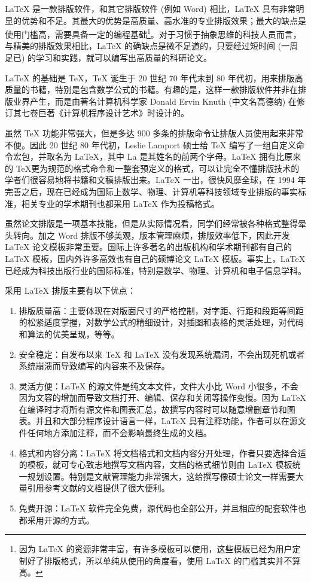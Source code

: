\LaTeX{} 是一款排版软件，和其它排版软件 (例如 Word) 相比，\LaTeX{} 具有非常明显的优势和不足。其最大的优势是高质量、高水准的专业排版效果；最大的缺点是使用门槛高，需要具备一定的编程基础\footnote{因为 \LaTeX{} 的资源非常丰富，有许多模板可以使用，这些模板已经为用户定制好了排版格式，所以单纯从使用的角度看，使用 \LaTeX{} 的门槛其实并不算高。}。对于习惯于抽象思维的科技人员而言，与精美的排版效果相比，\LaTeX{} 的确缺点是微不足道的，只要经过短时间 (一周足已) 的学习和实践，就可以编写出高质量的科研论文。

\LaTeX{} 的基础是 \TeX，\TeX{} 诞生于 20 世纪 70 年代末到 80 年代初，用来排版高质量的书籍，特别是包含数学公式的书籍。有趣的是，这样一款排版软件并非在排版业界产生，而是由著名计算机科学家 Donald Ervin Knuth (中文名高德纳) 在修订其七卷巨著《计算机程序设计艺术》时设计的。

虽然 \TeX{} 功能非常强大，但是多达 900 多条的排版命令让排版人员使用起来非常不便。因此 20 世纪 80 年代初，Leslie Lamport 硕士给 \TeX{} 编写了一组自定义命令宏包，并取名为 \LaTeX，其中 La 是其姓名的前两个字母。\LaTeX{} 拥有比原来的 \TeX 更为规范的格式命令和一整套预定义的格式，可以让完全不懂排版技术的学者们很容易地将书籍和文稿排版出来。\LaTeX{} 一出，很快风靡全球，在 1994 年 \LaTeXe{} 完善之后，现在已经成为国际上数学、物理、计算机等科技领域专业排版的事实标准，相关专业的学术期刊也都采用 \LaTeX{} 作为投稿格式。


虽然论文排版是一项基本技能，但是从实际情况看，同学们经常被各种格式整得晕头转向。加之 Word 排版不够美观，版本管理麻烦，排版效率低下，因此开发 \LaTeX{} 论文模板非常重要。国际上许多著名的出版机构和学术期刊都有自己的 \LaTeX{} 模板，国内外许多高效也有自己的硕博论文 \LaTeX{} 模板。事实上，\LaTeX{} 已经成为科技出版行业的国际标准，特别是数学、物理、计算机和电子信息学科。

采用 \LaTeX{} 排版主要有以下优点：
\begin{enumerate}
	\item 排版质量高：主要体现在对版面尺寸的严格控制，对字距、行距和段距等间距的松紧适度掌握，对数学公式的精细设计，对插图和表格的灵活处理，对代码和算法的优美呈现，等等。
	\item 安全稳定：自发布以来 \TeX{} 和 \LaTeX{} 没有发现系统漏洞，不会出现死机或者系统崩溃而导致编写的内容来不及保存。
	\item 灵活方便：\LaTeX{} 的源文件是纯文本文件，文件大小比 Word 小很多，不会因为文容的增加而导致文档打开、编辑、保存和关闭等操作变慢。因为 \LaTeX{} 在编译时才将所有源文件和图表汇总，故撰写内容时可以随意增删章节和图表。并且和大部分程序设计语言一样，\LaTeX{} 具有注释功能，作者可以在源文件任何地方添加注释，而不会影响最终生成的文档。
	\item 格式和内容分离：\LaTeX{} 将文档格式和文档内容分开处理，作者只要选择合适的模板，就可专心致志地撰写文档内容，文档的格式细节则由 \LaTeX{} 模板统一规划设置。特别是文献管理能力非常强大，这给撰写像硕士论文一样需要大量引用参考文献的文档提供了很大便利。
	\item 免费开源：\LaTeX{} 软件完全免费，源代码也全部公开，并且相应的配套软件也都采用开源的方式。
\end{enumerate}

